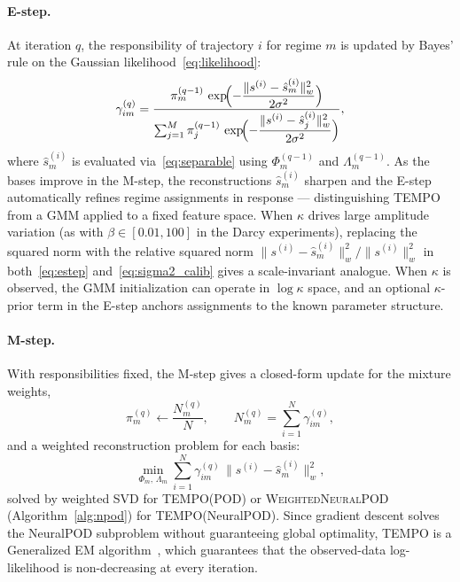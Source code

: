 \documentclass{article}
\begin{document}
\paragraph{E-step.}
At iteration $q$, the responsibility of trajectory $i$ for regime $m$
is updated by Bayes' rule on the Gaussian likelihood~\eqref{eq:likelihood}:
\begin{equation}
  \gamma_{im}^{(q)}
  = \frac{
    \pi_m^{(q-1)}\,
    \exp\!\Bigl(-\dfrac{\|s^{(i)}-\hat{s}_m^{(i)}\|_w^2}{2\sigma^2}\Bigr)
  }{
    \sum_{j=1}^{M}
    \pi_j^{(q-1)}\,
    \exp\!\Bigl(-\dfrac{\|s^{(i)}-\hat{s}_j^{(i)}\|_w^2}{2\sigma^2}\Bigr)
  },
  \label{eq:estep}
\end{equation}
where $\hat{s}_m^{(i)}$ is evaluated via~\eqref{eq:separable}
using $\Phi_m^{(q-1)}$ and $\Lambda_m^{(q-1)}$.
As the bases improve in the M-step, the reconstructions $\hat{s}_m^{(i)}$
sharpen and the E-step automatically refines regime assignments in response —
distinguishing TEMPO from a GMM applied to a fixed feature space.
When $\kappa$ drives large amplitude variation (as with $\beta\in[0.01,100]$
in the Darcy experiments), replacing the squared norm with the relative squared norm
$\|s^{(i)}-\hat{s}_m^{(i)}\|_w^2/\|s^{(i)}\|_w^2$ in both~\eqref{eq:estep}
and~\eqref{eq:sigma2_calib} gives a scale-invariant analogue.
When $\kappa$ is observed, the GMM initialization can operate in $\log\kappa$
space, and an optional $\kappa$-prior term in the E-step anchors assignments
to the known parameter structure.

\paragraph{M-step.}
With responsibilities fixed, the M-step gives a closed-form update
for the mixture weights,
\begin{equation}
  \pi_m^{(q)} \leftarrow \frac{N_m^{(q)}}{N},
  \qquad N_m^{(q)} = \sum_{i=1}^{N}\gamma_{im}^{(q)},
  \label{eq:mstep_pi}
\end{equation}
and a weighted reconstruction problem for each basis:
\begin{equation}
  \min_{\Phi_m,\,\Lambda_m}
  \sum_{i=1}^{N} \gamma_{im}^{(q)}\,\|s^{(i)} - \hat{s}_m^{(i)}\|_w^2,
  \label{eq:mstep_phi}
\end{equation}
solved by weighted SVD for TEMPO(POD) or
\textsc{WeightedNeuralPOD} (Algorithm~\ref{alg:npod}) for
TEMPO(NeuralPOD).
Since gradient descent solves the NeuralPOD subproblem without guaranteeing
global optimality, TEMPO is a Generalized EM algorithm~\cite{Neal1998},
which guarantees that the observed-data log-likelihood is non-decreasing
at every iteration.
\end{document}
